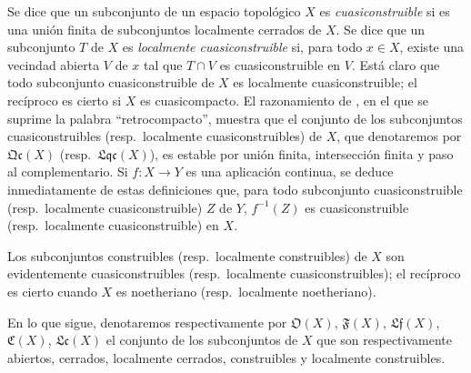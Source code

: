 \begin{env}[10.1.1]
\label{IV.10.1.1}
Se dice que un subconjunto de un espacio topológico $X$ es \emph{cuasiconstruible} si es una unión finita de subconjuntos localmente cerrados de $X$.
Se dice que un subconjunto $T$ de $X$ es \emph{localmente cuasiconstruible} si, para todo $x\in X$, existe una vecindad abierta $V$ de $x$ tal que $T\cap V$ es cuasiconstruible en $V$.
Está claro que todo subconjunto cuasiconstruible de $X$ es localmente cuasiconstruible; el recíproco es cierto si $X$ es cuasicompacto.
El razonamiento de , en el que se suprime la palabra ``retrocompacto'', muestra que el conjunto de los subconjuntos cuasiconstruibles (resp.\ localmente cuasiconstruibles) de $X$, que denotaremos por $\mathfrak{Qc}(X)$ (resp.\ $\mathfrak{Lqc}(X)$), es estable por unión finita, intersección finita y paso al complementario.
Si $f:X\to Y$ es una aplicación continua, se deduce inmediatamente de estas definiciones que, para todo subconjunto cuasiconstruible (resp.\ localmente cuasiconstruible) $Z$ de $Y$, $f^{-1}(Z)$ es cuasiconstruible (resp.\ localmente cuasiconstruible) en $X$.

Los subconjuntos construibles (resp.\ localmente construibles) de $X$ son evidentemente cuasiconstruibles (resp.\ localmente cuasiconstruibles); el recíproco es cierto cuando $X$ es noetheriano (resp.\ localmente noetheriano).

En lo que sigue, denotaremos respectivamente por $\mathfrak O(X)$, $\mathfrak F(X)$, $\mathfrak{Lf}(X)$, $\mathfrak C(X)$, $\mathfrak{Lc}(X)$ el conjunto de los subconjuntos de $X$ que son respectivamente abiertos, cerrados, localmente cerrados, construibles y localmente construibles.
\end{env}


